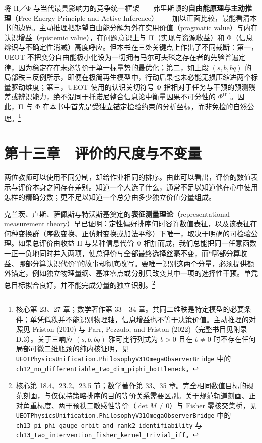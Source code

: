 \documentclass[
  11pt,
  oneside]{book}
\begin{document}
将 Π／Φ 与当代最具影响力的竞争统一框架------弗里斯顿的\textbf{自由能原理与主动推理}（Free Energy Principle and Active Inference）------加以正面比较，最能看清本书的边界。主动推理把期望自由能分解为外在实用价值（pragmatic value）与内在认识增益（epistemic value），在问题意识上与 Π（实现与资源收益）和 Φ（信息辨识与不确定性消减）高度呼应。但本书在三处关键点上作出了不同裁断：第一，UEOT 不把变分自由能极小化设为一切拥有马尔可夫毯之存在者的先验普遍定律，因为稳定存在未必等价于单一标量势的最优化；第二，如上段 \((s,b,bq)\) 的局部秩三反例所示，即便在极简再生模型中，行动后果也未必能无损压缩进两个标量驱动维度；第三，UEOT 使用的认识关切符号 Φ 指相对于任务与干预的预测残差或辨识能力，绝不混同于托诺尼整合信息论中衡量因果不可分性的 \(\Phi^{\mathrm{IIT}}\)。因此，Π 与 Φ 在本书中首先是受独立锚定检验约束的分析坐标，而非免检的自然公理。\footnote{\hypertarget{ph-note-35}{}核心第 23、27 章；数学著作第 33---34 章。共同二维秩是特定模型的必要条件；单凭低秩并不能识别物理轴，信息增益也不等于决策价值。主动推理的对照见 Friston (2010) 与 Parr, Pezzulo, and Friston (2022)（完整书目见附录 D.3）。关于三响应 \((s,b,bq)\) 雅可比行列式为 \(b>0\) 且在 \(b\neq 0\) 时不存在任何局部可微二维瓶颈的纯内核证明，见 \nolinkurl{UEOTPhysicsUnification.PhilosophyV31OmegaObserverBridge} 中的 \nolinkurl{ch12_no_differentiable_two_dim_piphi_bottleneck}。}

\par\endgroup

\chapter{第十三章　评价的尺度与不变量}\label{ph-ch-13}

两位教师可以使用不同分制，却给作业相同的排序。由此可以看出，评价的数值表示与评价本身之间存在差别。知道一个人选了什么，通常不足以知道他在心中使用怎样的精确分数；更不足以知道一个总分由多少独立价值分量组成。

克兰茨、卢斯、萨佩斯与特沃斯基奠定的\textbf{表征测量理论}（representational measurement theory）早已证明：定性偏好排序何时容许数值表征，以及该表征在何种变换群（序数变换、正仿射变换或加法平移）下唯一，取决于明确的可检验公理。如果总评价由收益 Π 与某种信息代价 Φ 相加而成，我们总能把同一任意函数一正一负地同时并入两项，使总评价与全部最终选择丝毫不变，而``哪部分算收益、哪部分算认识代价''的故事却彻底改写。要唯一识别这两个分量，必须提供额外锚定，例如独立物理量纲、基准零点或分别只改变其中一项的选择性干预。单凭总目标拟合良好，并不能完成分量的独立识别。\footnote{\hypertarget{ph-note-36}{}核心第 18.4、23.2、23.5 节；数学著作第 33、35 章。完全相同数值目标的规范刻画，与仅保持策略排序的目的等价关系需要区别。关于规范轨道刻画、正对角重标度、两干预秩二敏感性等价（\(\det M \neq 0\)）与 Fisher 零核交集桥，见 \nolinkurl{UEOTPhysicsUnification.PhilosophyV31OmegaObserverBridge} 中的 \nolinkurl{ch13_pi_phi_gauge_orbit_and_rank2_identifiability} 与 \nolinkurl{ch13_two_intervention_fisher_kernel_trivial_iff}。}
\end{document}
